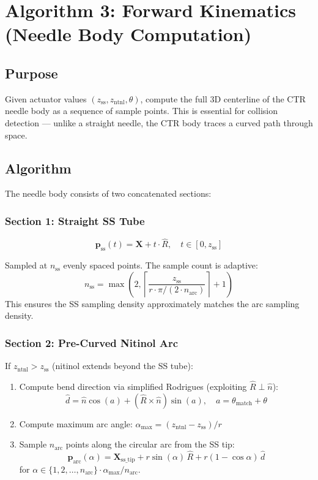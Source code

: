 \documentclass[11pt,a4paper]{article}
\begin{document}
\section{Algorithm 3: Forward Kinematics (Needle Body Computation)}
\label{sec:fk}

\subsection{Purpose}

Given actuator values $(z_\text{ss}, z_\text{ntnl}, \theta)$, compute the full 3D centerline of the CTR needle body as a sequence of sample points. This is essential for collision detection --- unlike a straight needle, the CTR body traces a curved path through space.

\subsection{Algorithm}

The needle body consists of two concatenated sections:

\subsubsection{Section 1: Straight SS Tube}

\[
\mathbf{p}_\text{ss}(t) = \mathbf{X} + t \cdot \hat{R}, \quad t \in [0, z_\text{ss}]
\]

Sampled at $n_\text{ss}$ evenly spaced points. The sample count is adaptive:
\[
n_\text{ss} = \max\left(2, \left\lceil \frac{z_\text{ss}}{r \cdot \pi / (2 \cdot n_\text{arc})} \right\rceil + 1\right)
\]
This ensures the SS sampling density approximately matches the arc sampling density.

\subsubsection{Section 2: Pre-Curved Nitinol Arc}

If $z_\text{ntnl} > z_\text{ss}$ (nitinol extends beyond the SS tube):

\begin{enumerate}[nosep]
    \item Compute bend direction via simplified Rodrigues (exploiting $\hat{R} \perp \hat{n}$):
    \[
    \hat{d} = \hat{n} \cos(a) + (\hat{R} \times \hat{n}) \sin(a), \quad a = \theta_\text{match} + \theta
    \]
    \item Compute maximum arc angle: $\alpha_\text{max} = (z_\text{ntnl} - z_\text{ss}) / r$
    \item Sample $n_\text{arc}$ points along the circular arc from the SS tip:
    \[
    \mathbf{p}_\text{arc}(\alpha) = \mathbf{X}_\text{ss\_tip} + r \sin(\alpha)\,\hat{R} + r(1 - \cos\alpha)\,\hat{d}
    \]
    for $\alpha \in \{1, 2, \ldots, n_\text{arc}\} \cdot \alpha_\text{max} / n_\text{arc}$.
\end{enumerate}
\end{document}
